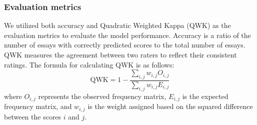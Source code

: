 \subsubsection*{Evaluation metrics\label{sec:metric}}
We utilized both accuracy and Quadratic Weighted Kappa (QWK) as the evaluation metrics to evaluate the model performance. Accuracy is a ratio of the number of essays with correctly predicted scores to the total number of essays. QWK measures the agreement between two raters to reflect their consistent ratings. The formula for calculating QWK is as follows:
\begin{equation}
\text{QWK} = 1 - \frac{\sum_{i,j} w_{i,j} O_{i,j}}{\sum_{i,j} w_{i,j} E_{i,j}}
\end{equation}
where \( O_{i,j} \) represents the observed frequency matrix, \( E_{i,j} \) is the expected frequency matrix, and \( w_{i,j} \) is the weight assigned based on the squared difference between the scores \( i \) and \( j \).


